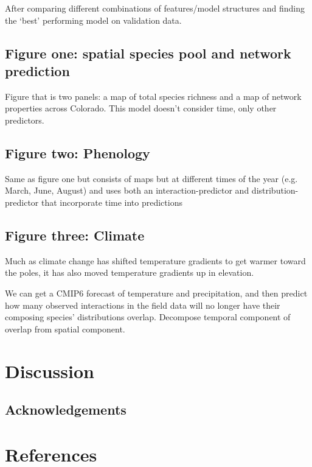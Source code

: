 \documentclass[11pt]{article}
\begin{document}
After comparing different combinations of features/model structures and
finding the `best' performing model on validation data.

\hypertarget{figure-one-spatial-species-pool-and-network-prediction}{%
\subsection{Figure one: spatial species pool and network
prediction}\label{figure-one-spatial-species-pool-and-network-prediction}}

Figure that is two panels: a map of total species richness and a map of
network properties across Colorado. This model doesn't consider time,
only other predictors.

\hypertarget{figure-two-phenology}{%
\subsection{Figure two: Phenology}\label{figure-two-phenology}}

Same as figure one but consists of maps but at different times of the
year (e.g. March, June, August) and uses both an interaction-predictor
and distribution-predictor that incorporate time into predictions

\hypertarget{figure-three-climate}{%
\subsection{Figure three: Climate}\label{figure-three-climate}}

Much as climate change has shifted temperature gradients to get warmer
toward the poles, it has also moved temperature gradients up in
elevation.

We can get a CMIP6 forecast of temperature and precipitation, and then
predict how many observed interactions in the field data will no longer
have their composing species' distributions overlap. Decompose temporal
component of overlap from spatial component.

\hypertarget{discussion}{%
\section{Discussion}\label{discussion}}

\hypertarget{acknowledgements}{%
\subsection{Acknowledgements}\label{acknowledgements}}

\hypertarget{references}{%
\section{References}\label{references}}
\end{document}
